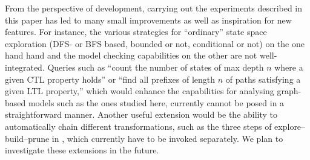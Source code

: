 \medskip\noindent From the perspective of \GROOVE development, carrying out the experiments described in this paper has led to many small improvements as well as inspiration for new features. For instance, the various strategies for ``ordinary'' state space exploration (DFS- or BFS based, bounded or not, conditional or not) on the one hand hand and the model checking capabilities on the other are not well-integrated. Queries such as ``count the number of states of max depth $n$ where a given CTL property holds'' or ``find all prefixes of length $n$ of paths satisfying a given LTL property,'' which would enhance the capabilities for analysing graph-based models such as the ones studied here, currently cannot be posed in a straightforward manner. Another useful extension would be the ability to automatically chain different transformations, such as the three steps of explore--build--prune in , which currently have to be invoked separately. We plan to investigate these extensions in the future.
